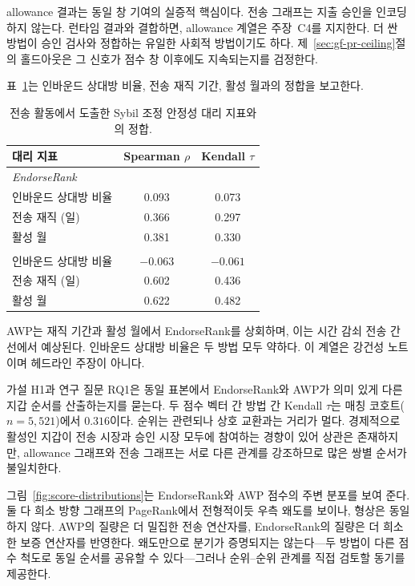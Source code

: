 allowance 결과는 동일 창 기여의 실증적 핵심이다. 전송 그래프는 지출 승인을 인코딩하지 않는다. 런타임 결과와 결합하면, allowance 계열은 주장~C4를 지지한다. 더 싼 방법이 승인 검사와 정합하는 유일한 사회적 방법이기도 하다. 제~\ref{sec:gf-pr-ceiling}절의 홀드아웃은 그 신호가 점수 창 이후에도 지속되는지를 검정한다.


표~\ref{tab:alignment-sybil-stability}는 인바운드 상대방 비율, 전송 재직 기간, 활성 월과의 정합을 보고한다.

\begin{table}[htbp]
\centering
\caption{전송 활동에서 도출한 Sybil 조정 안정성 대리 지표와의 정합.}
\label{tab:alignment-sybil-stability}
\begin{tabular}{lcc}
\toprule
대리 지표 & Spearman $\rho$ & Kendall $\tau$ \\
\midrule
\multicolumn{3}{l}{\textit{EndorseRank}} \\
인바운드 상대방 비율 & 0.093 & 0.073 \\
전송 재직 (일) & 0.366 & 0.297 \\
활성 월 & 0.381 & 0.330 \\
\addlinespace
\multicolumn{3}{l}{\textit{AWP}} \\
인바운드 상대방 비율 & $-0.063$ & $-0.061$ \\
전송 재직 (일) & 0.602 & 0.436 \\
활성 월 & 0.622 & 0.482 \\
\bottomrule
\end{tabular}
\end{table}

AWP는 재직 기간과 활성 월에서 EndorseRank를 상회하며, 이는 시간 감쇠 전송 간선에서 예상된다. 인바운드 상대방 비율은 두 방법 모두 약하다. 이 계열은 강건성 노트이며 헤드라인 주장이 아니다.


가설 H1과 연구 질문 RQ1은 동일 표본에서 EndorseRank와 AWP가 의미 있게 다른 지갑 순서를 산출하는지를 묻는다. 두 점수 벡터 간 방법 간 Kendall $\tau$는 매칭 코호트($n=5{,}521$)에서 $0.316$이다. 순위는 관련되나 상호 교환과는 거리가 멀다. 경제적으로 활성인 지갑이 전송 시장과 승인 시장 모두에 참여하는 경향이 있어 상관은 존재하지만, allowance 그래프와 전송 그래프는 서로 다른 관계를 강조하므로 많은 쌍별 순서가 불일치한다.

그림~\ref{fig:score-distributions}는 EndorseRank와 AWP 점수의 주변 분포를 보여 준다. 둘 다 희소 방향 그래프의 PageRank에서 전형적이듯 우측 왜도를 보이나, 형상은 동일하지 않다. AWP의 질량은 더 밀집한 전송 연산자를, EndorseRank의 질량은 더 희소한 보증 연산자를 반영한다. 왜도만으로 분기가 증명되지는 않는다---두 방법이 다른 점수 척도로 동일 순서를 공유할 수 있다---그러나 순위--순위 관계를 직접 검토할 동기를 제공한다.

